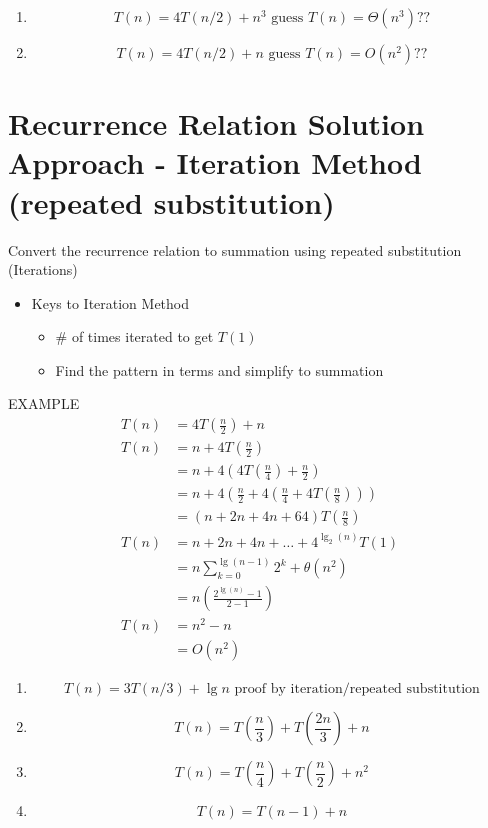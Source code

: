 \documentclass[12pt]{report}
\begin{document}
\begin{enumerate}[label=\arabic*.]
    \item \[ T(n) = 4T(n/2) + n^{3}    \mbox{     guess }T(n)=\Theta(n^{3}) ?? \]
	\item \[ T(n) = 4T(n/2) + n    \mbox{     guess } T(n)=O(n^{2}) ?? \]
\end{enumerate}

\section{Recurrence Relation Solution Approach - Iteration Method (repeated substitution)}\label{sec:recurrence-relation-solution-approach---iteration-method-(repeated-substitution)}
Convert the recurrence relation to summation using repeated substitution (Iterations)
\begin{itemize}
	\item Keys to Iteration Method
	\begin{itemize}
		\item \# of times iterated to get $T(1)$
		\item Find the pattern in terms and simplify to summation
	\end{itemize}
\end{itemize}
EXAMPLE
\begin{equation*}
\begin{aligned}
	T(n) &= 4T\left( \frac{n}{2} \right) + n\\
	T(n) &= n + 4T\left( \frac{n}{2} \right) \\
		 &= n + 4\left( 4T\left( \frac{n}{4} \right) + \frac{n}{2}\right) \\
		 &= n + 4\left( \frac{n}{2} + 4\left(\frac{n}{4} + 4T\left( \frac{n}{8} \right) \right) \right) \\
		 &= (n + 2n + 4n + 64)T\left( \frac{n}{8} \right)\\
	T(n) &= n + 2n + 4n + \dots + 4^{\lg_{2}(n)}T(1)\\
		 &= n \sum_{k=0}^{\lg(n-1)}2^{k}+\theta(n^{2})\\
		 &= n\left( \frac{2^{\lg(n)}-1}{2-1} \right)\\
	T(n) &= n^{2} - n\\
		 &= O(n^{2})
\end{aligned}
\end{equation*}

\begin{enumerate}[label=\arabic*., start=3]
    \item \[ T(n) = 3T(n/3) + \lg n \mbox{   proof by iteration/repeated substitution} \]
	\item \[ T(n)=T\left( \frac{n}{3} \right) + T\left( \frac{2n}{3} \right) + n \]
	\item \[ T(n)=T\left( \frac{n}{4} \right) + T\left( \frac{n}{2} \right) + n^{2} \]
	\item \[ T(n)=T(n-1) + n \]
\end{enumerate}
\end{document}
